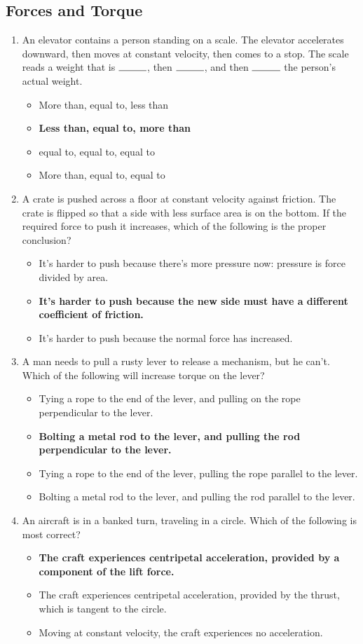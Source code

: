 \documentclass[10pt]{article}
\begin{document}
\subsection{Forces and Torque}
\begin{enumerate}
\item An elevator contains a person standing on a scale.  The elevator accelerates downward, then moves at constant velocity, then comes to a stop.  The scale reads a weight that is $\rule{1cm}{0.15mm}$, then $\rule{1cm}{0.15mm}$, and then $\rule{1cm}{0.15mm}$ the person's actual weight.
\begin{itemize}
\item More than, equal to, less than
\item \textbf{Less than, equal to, more than}
\item equal to, equal to, equal to
\item More than, equal to, equal to
\end{itemize}
\item A crate is pushed across a floor at constant velocity against friction.  The crate is flipped so that a side with less surface area is on the bottom.  If the required force to push it increases, which of the following is the proper conclusion?
\begin{itemize}
\item It's harder to push because there's more pressure now: pressure is force divided by area.
\item \textbf{It's harder to push because the new side must have a different coefficient of friction.}
\item It's harder to push because the normal force has increased.
\end{itemize}
\item A man needs to pull a rusty lever to release a mechanism, but he can't.  Which of the following will increase torque on the lever?
\begin{itemize}
\item Tying a rope to the end of the lever, and pulling on the rope perpendicular to the lever.
\item \textbf{Bolting a metal rod to the lever, and pulling the rod perpendicular to the lever.}
\item Tying a rope to the end of the lever, pulling the rope parallel to the lever.
\item Bolting a metal rod to the lever, and pulling the rod parallel to the lever.
\end{itemize}
\item An aircraft is in a banked turn, traveling in a circle.  Which of the following is most correct?
\begin{itemize}
\item \textbf{The craft experiences centripetal acceleration, provided by a component of the lift force.}
\item The craft experiences centripetal acceleration, provided by the thrust, which is tangent to the circle.
\item Moving at constant velocity, the craft experiences no acceleration.
\end{itemize}
\end{enumerate}
\end{document}
